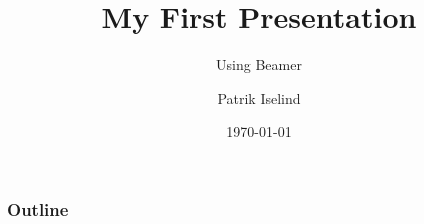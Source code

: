 \documentclass{beamer}
\title{My First Presentation}
\subtitle{Using Beamer}
\author{Patrik Iselind}
\institute{University of ShareLaTeX}
\date{\today}
\begin{document}
\begin{frame}
\titlepage
\end{frame}
\begin{frame}
\frametitle{Outline}
\tableofcontents
\end{frame}



\end{document}
